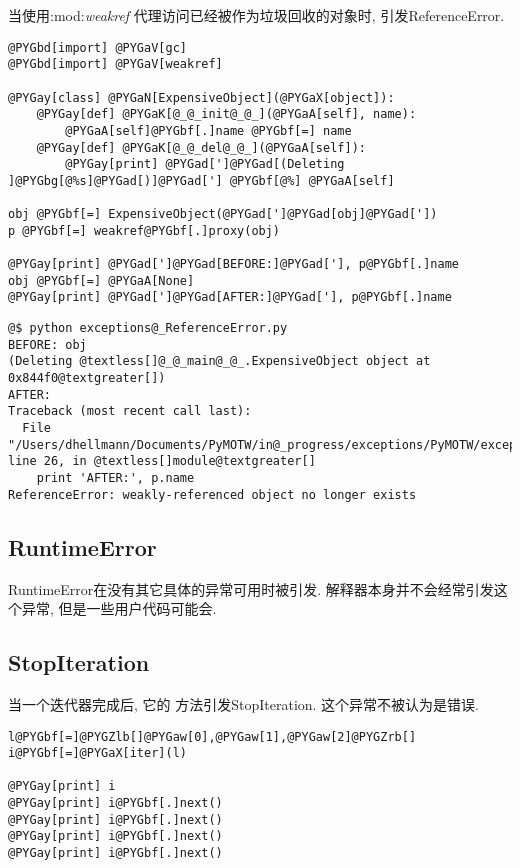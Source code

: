 \documentclass[a4paper,10pt,english]{manual}
\begin{document}
当使用:mod:\emph{weakref} 代理访问已经被作为垃圾回收的对象时, 引发ReferenceError.

\begin{Verbatim}[commandchars=@\[\]]
@PYGbd[import] @PYGaV[gc]
@PYGbd[import] @PYGaV[weakref]

@PYGay[class] @PYGaN[ExpensiveObject](@PYGaX[object]):
    @PYGay[def] @PYGaK[@_@_init@_@_](@PYGaA[self], name):
        @PYGaA[self]@PYGbf[.]name @PYGbf[=] name
    @PYGay[def] @PYGaK[@_@_del@_@_](@PYGaA[self]):
        @PYGay[print] @PYGad[']@PYGad[(Deleting ]@PYGbg[@%s]@PYGad[)]@PYGad['] @PYGbf[@%] @PYGaA[self]

obj @PYGbf[=] ExpensiveObject(@PYGad[']@PYGad[obj]@PYGad['])
p @PYGbf[=] weakref@PYGbf[.]proxy(obj)

@PYGay[print] @PYGad[']@PYGad[BEFORE:]@PYGad['], p@PYGbf[.]name
obj @PYGbf[=] @PYGaA[None]
@PYGay[print] @PYGad[']@PYGad[AFTER:]@PYGad['], p@PYGbf[.]name
\end{Verbatim}

\begin{Verbatim}[commandchars=@\[\]]
@$ python exceptions@_ReferenceError.py
BEFORE: obj
(Deleting @textless[]@_@_main@_@_.ExpensiveObject object at 0x844f0@textgreater[])
AFTER:
Traceback (most recent call last):
  File "/Users/dhellmann/Documents/PyMOTW/in@_progress/exceptions/PyMOTW/exceptions/exceptions@_ReferenceError.py", line 26, in @textless[]module@textgreater[]
    print 'AFTER:', p.name
ReferenceError: weakly-referenced object no longer exists
\end{Verbatim}


\subsection{RuntimeError}

RuntimeError在没有其它具体的异常可用时被引发. 解释器本身并不会经常引发这个异常, 但是一些用户代码可能会.


\subsection{StopIteration}

当一个迭代器完成后, 它的  方法引发StopIteration. 这个异常不被认为是错误.

\begin{Verbatim}[commandchars=@\[\]]
l@PYGbf[=]@PYGZlb[]@PYGaw[0],@PYGaw[1],@PYGaw[2]@PYGZrb[]
i@PYGbf[=]@PYGaX[iter](l)

@PYGay[print] i
@PYGay[print] i@PYGbf[.]next()
@PYGay[print] i@PYGbf[.]next()
@PYGay[print] i@PYGbf[.]next()
@PYGay[print] i@PYGbf[.]next()
\end{Verbatim}
\end{document}
